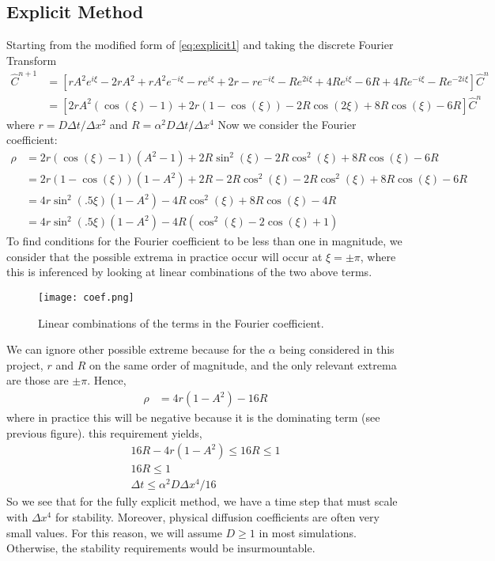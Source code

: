 \documentclass[]{article}
\theoremstyle{definition}
\numberwithin{equation}{section}
\numberwithin{equation}{section}
\begin{document}
	\subsection{Explicit Method} Starting from the modified form of \eqref{eq:explicit1} and taking the discrete Fourier Transform
	\begin{align*}
		\hat{C}^{n+1} &= \left[rA^2e^{i\xi} -2rA^2 + rA^2e^{-i\xi} - r e^{i\xi} + 2r - re^{-i\xi} - Re^{2i\xi} + 4Re^{i\xi} - 6R + 4Re^{-i\xi} - Re^{-2i\xi}\right] \hat{C}^n \\
		&= \left[2rA^2(\cos(\xi) - 1)+ 2r (1 - \cos(\xi)) - 2R \cos(2\xi) + 8R\cos(\xi) - 6R \right] \hat{C}^n
	\end{align*}
	where $r = D\Delta t/\Delta x^2$ and $R = \alpha^2D\Delta t/\Delta x^4$
	Now we consider the Fourier coefficient:
	\begin{align*}
		\rho &= 2r\left(\cos(\xi) - 1\right) ( A^2 - 1) + 2R \sin^2(\xi) - 2R\cos^2(\xi) + 8R\cos(\xi) - 6R \\
		&= 2r\left(1 - \cos(\xi) \right) ( 1 - A^2) + 2R - 2R\cos^2(\xi) - 2R\cos^2(\xi) + 8R\cos(\xi) - 6R \\
		&= 4r \sin^2(.5\xi) (1-A^2) - 4R\cos^2(\xi) + 8R\cos(\xi) - 4R \\
		&= 4r \sin^2(.5\xi) (1-A^2) - 4R \left( \cos^2(\xi) -2\cos(\xi) +1 \right)
	\end{align*}
	To find conditions for the Fourier coefficient to be less than one in magnitude, we consider that the possible extrema in practice occur will occur at  $\xi = \pm \pi$, where this is inferenced by looking at linear combinations of the two above terms.
		\begin{figure}[H]
		\centering
		\texttt{[image: coef.png]} 
		\caption{Linear combinations of the terms in the Fourier coefficient.}
		\label{fig:coef}
	\end{figure}
	 We can ignore other possible extreme because for the $\alpha$ being considered in this project, $r$ and $R$ on the same order of magnitude, and the only relevant extrema are those are $\pm \pi$. Hence,
	\begin{align*}
		\rho &= 4r (1-A^2) - 16R 
	\end{align*}
	where in practice this will be negative because it is the dominating term (see previous figure).  this requirement yields, 
	\begin{gather*}
		16R - 4r (1-A^2) \leq 16R \leq 1 \\
		16R \leq 1 \\
		\Delta t \leq \alpha^2 D \Delta x^4/16
	\end{gather*}
	So we see that for the fully explicit method, we have a time step that must scale with $\Delta x^4$ for stability. Moreover, physical diffusion coefficients are often very small values. For this reason, we will assume $D \geq 1$ in most simulations. Otherwise, the stability requirements would be insurmountable.
\end{document}
